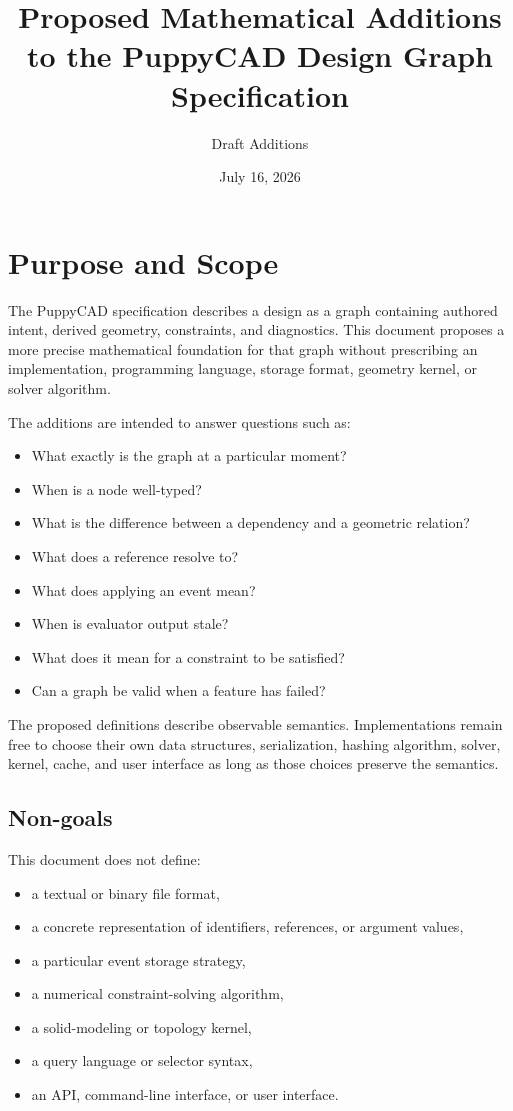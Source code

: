 \documentclass[11pt]{article}
\title{Proposed Mathematical Additions\\to the PuppyCAD Design Graph Specification}
\author{Draft Additions}
\date{July 16, 2026}
\begin{document}
\maketitle
\tableofcontents
\newpage

\section{Purpose and Scope}

The PuppyCAD specification describes a design as a graph containing authored
intent, derived geometry, constraints, and diagnostics. This document proposes
a more precise mathematical foundation for that graph without prescribing an
implementation, programming language, storage format, geometry kernel, or
solver algorithm.

The additions are intended to answer questions such as:

\begin{itemize}
  \item What exactly is the graph at a particular moment?
  \item When is a node well-typed?
  \item What is the difference between a dependency and a geometric relation?
  \item What does a reference resolve to?
  \item What does applying an event mean?
  \item When is evaluator output stale?
  \item What does it mean for a constraint to be satisfied?
  \item Can a graph be valid when a feature has failed?
\end{itemize}

The proposed definitions describe observable semantics. Implementations remain
free to choose their own data structures, serialization, hashing algorithm,
solver, kernel, cache, and user interface as long as those choices preserve the
semantics.

\subsection{Non-goals}

This document does not define:

\begin{itemize}
  \item a textual or binary file format,
  \item a concrete representation of identifiers, references, or argument values,
  \item a particular event storage strategy,
  \item a numerical constraint-solving algorithm,
  \item a solid-modeling or topology kernel,
  \item a query language or selector syntax,
  \item an API, command-line interface, or user interface.
\end{itemize}
\end{document}
